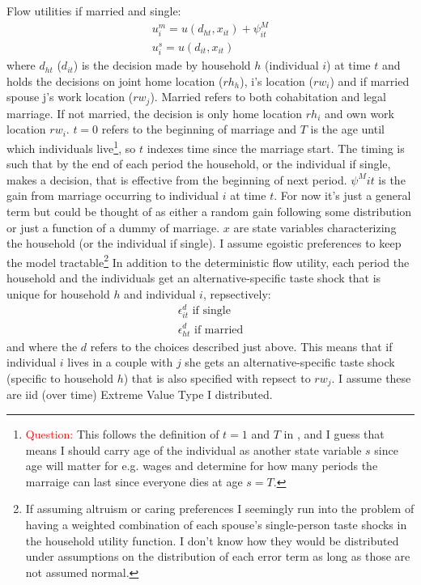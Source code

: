 Flow utilities if married and single: 
\begin{align*}
u_i^m = u(d_{ht},x_{it})+\psi^M_{it} \\
u_i^s = u(d_{it},x_{it})
\end{align*}
where $d_{ht}$ ($d_{it}$) is the decision made by household $h$ (individual $i$) at time $t$ and holds the decisions on joint home location ($rh_h$), i's location ($rw_i$) and if married spouse j's work location ($rw_j$). Married refers to both cohabitation and legal marriage. If not married, the decision is only home location $rh_i$ and own work location $rw_i$. $t=0$ refers to the beginning of marriage and $T$ is the age until which individuals live\footnote{\textcolor{red}{Question:} This follows the definition of $t=1$ and $T$ in \cite{Voena2015}, and I guess that means I should carry age of the individual as another state variable $s$ since age will matter for e.g. wages and determine for how many periods the marraige can last since everyone dies at age $s=T$.}, so $t$ indexes time since the marriage start. The timing is such that by the end of each period the household, or the individual if single, makes a decision, that is effective from the beginning of next period. $\psi^M{it}$ is the gain from marriage occurring to individual $i$ at time $t$. For now it's just a general term but could be thought of as either a random gain following some distribution or just a function of a dummy of marriage. $x$ are state variables characterizing the household (or the individual if single). I assume egoistic preferences to keep the model tractable\footnote{If assuming altruism or caring preferences I seemingly run into the problem of having a weighted combination of each spouse's single-person taste shocks in the household utility function. I don't know how they would be distributed under assumptions on the distribution of each error term as long as those are not assumed normal.} In addition to the deterministic flow utility, each period the household and the individuals get an alternative-specific taste shock that is unique for household $h$ and individual $i$, repsectively:
\begin{align*}
\epsilon_{it}^d \text{ if single} \\
\epsilon_{ht}^d \text{ if married} 
\end{align*}
and where the $d$ refers to the choices described just above. This means that if individual $i$ lives in a couple with $j$ she gets an alternative-specific taste shock (specific to household $h$) that is also specified with repsect to $rw_j$. I assume these are iid (over time) Extreme Value Type I distributed. 

